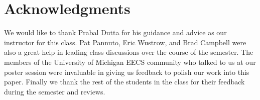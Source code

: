 \section{Acknowledgments}
\label{sec:ack}

We would like to thank Prabal Dutta for his guidance and advice as our instructor for this class. Pat Pannuto, Eric Wustrow, and Brad Campbell were also a great help in leading class discussions over the course of the semester. The members of the University of Michigan EECS community who talked to us at our poster session were invaluable in giving us feedback to polish our work into this paper. Finally we thank the rest of the students in the class for their feedback during the semester and reviews.